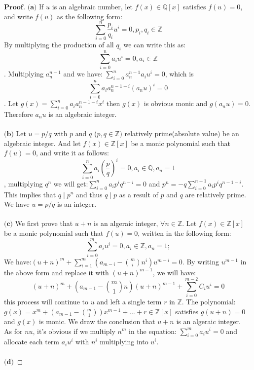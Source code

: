 \documentclass[a4paper, 11pt]{article}
\newenvironment{myprf}
{\renewcommand\qedsymbol{$ $}\begin{proof}[$\mathbf{Proof}$]}
  {\end{proof}}
\begin{document}
 \begin{myprf}
         $\textbf{(a)}$ If $u$ is an algebraic number, let $f(x)\in \mathbb{Q}[x]$ satisfies $f(u)=0$, and write
         $f(u)$ as the following form:
         $$
         \sum_{i=0}^{n}\frac{p_i}{q_i}u^i=0, p_i,q_i\in \mathbb{Z}
         $$ By multiplying the production of all $q_i$ we can write this as:
         $$
         \sum_{i=0}^{n}a_i u^i=0, a_i\in \mathbb{Z}
         $$. Multiplying $a_n^{n-1}$ and we have: $\displaystyle \sum_{i=0}^{n}a_n^{n-1}a_iu^i=0$, which is
         $$
         \sum_{i=0}^{n}a_ia_n^{n-1-i}(a_nu)^i=0
         $$. Let $\displaystyle g(x)=\sum_{i=0}^{n}a_ia_n^{n-1-i}x^i$ then $g(x)$ is obvious monic and $g(a_nu)=0$. Therefore 
         $a_nu$ is an algebraic integer.\\
         \vspace{0.2cm}
         \\
         $\textbf{(b)}$ Let $u=p/q$ with $p$ and $q$ ($p,q\in \mathbb{Z})$
         relatively prime(absolute value) be an algebraic integer. And let $f(x)\in \mathbb{Z}[x]$ be a monic
         polynomial such that $f(u)=0$, and write it as follows:
           $$
           \sum_{i=0}^{n}a_i(\frac{p}{q})^i=0, a_i\in \mathbb{Q}, a_n=1
           $$, multiplying $q^n$ we will get:$\displaystyle \sum_{i=0}^{n}a_ip^iq^{n-i}=0$ and $\displaystyle
           p^n=-q\sum_{i=0}^{n-1}a_ip^iq^{n-1-i}$.  This implies that $q\mid p^n$ and thus $q\mid p$ as a result
           of $p$ and $q$ are relatively prime. We have $u=p/q$ is an integer.\\
           \vspace{0.2cm}
           \\
           $\textbf{(c)}$ We first prove that $u+n$ is an algeraic integer, $\forall n\in \mathbb{Z}$. 
           Let $f(x) \in \mathbb{Z}[x]$ be a monic polynomial such that $f(u)=0$, written in the following 
           form:
           $$
           \sum_{i=0}^{m}a_iu^i=0, a_i\in \mathbb{Z}, a_n=1;
           $$ We have:$\displaystyle (u+n)^m+\sum_{i=1}^{m}(a_{m-i}-{{m}\choose{i}}n^i)u^{m-i}=0$. By writing 
           $u^{m-1}$ in the above form and replace it with $(u+n)^{m-1}$, we will have:
           $$
           (u+n)^{m}+(a_{m-1}-{{m}\choose{1}}n)(u+n)^{m-1}+\sum_{i=0}^{m-2}C_iu^i = 0
           $$ this process will continue to $u$ and left a single term $r$ in $\mathbb{Z}$. The polynomial:
           $\displaystyle g(x)=x^m+(a_{m-1}-{{m}\choose{1}})x^{m-1} +...+ r\in \mathbb{Z}[x]$ 
           satisfies $g(u+n)=0$ and $g(x)$ is monic. We draw the conclusion that $u+n$ is an algeraic integer.\\
           As for $nu$, it's obvious if we multiply $n^m$ in the equation: $\displaystyle \sum_{i=0}^{m}a_iu^i=0$
           and allocate each term $a_i u^i$ with $n^i$ multiplying into $u^i$.\\
           \vspace{0.2cm}
           \\
           $\textbf{(d)}$ 

        


 
    
         
 \end{myprf}


 
\end{document}
